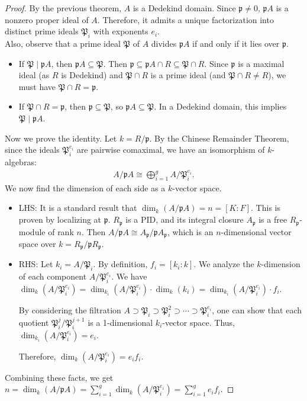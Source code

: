 \documentclass[12pt]{article}
\theoremstyle{plain}
\theoremstyle{remark}
\theoremstyle{definition}
\begin{document}
\begin{proof}
    By the previous theorem, $A$ is a Dedekind domain. Since $\mathfrak{p} \neq 0$, $\mathfrak{p}A$ is a nonzero proper ideal of $A$. Therefore, it admits a unique factorization into distinct prime ideals $\mathfrak{P}_i$ with exponents $e_i$. \\
    Also, observe that a prime ideal $\mathfrak{P}$ of $A$ divides $\mathfrak{p}A$ if and only if it lies over $\mathfrak{p}$.
    \begin{itemize}
        \item[($\implies$)] If $\mathfrak{P} \mid \mathfrak{p}A$, then $\mathfrak{p}A \subseteq \mathfrak{P}$. Then $\mathfrak{p} \subseteq \mathfrak{p}A \cap R \subseteq \mathfrak{P} \cap R$. Since $\mathfrak{p}$ is a maximal ideal (as $R$ is Dedekind) and $\mathfrak{P} \cap R$ is a prime ideal (and $\mathfrak{P} \cap R \neq R$), we must have $\mathfrak{P} \cap R = \mathfrak{p}$.
        \item[($\impliedby$)] If $\mathfrak{P} \cap R = \mathfrak{p}$, then $\mathfrak{p} \subseteq \mathfrak{P}$, so $\mathfrak{p}A \subseteq \mathfrak{P}$. In a Dedekind domain, this implies $\mathfrak{P} \mid \mathfrak{p}A$.
    \end{itemize}
    Now we prove the identity. Let $k = R/\mathfrak{p}$.
    By the Chinese Remainder Theorem, since the ideals $\mathfrak{P}_i^{e_i}$ are pairwise comaximal, we have an isomorphism of $k$-algebras:
    \begin{align*}
        A/\mathfrak{p}A \cong \bigoplus_{i=1}^g A/\mathfrak{P}_i^{e_i}.
    \end{align*}
    We now find the dimension of each side as a $k$-vector space.
    \begin{itemize}
        \item LHS: It is a standard result that $\dim_k(A/\mathfrak{p}A) = n = [K:F]$. This is proven by localizing at $\mathfrak{p}$. $R_\mathfrak{p}$ is a PID, and its integral closure $A_\mathfrak{p}$ is a free $R_\mathfrak{p}$-module of rank $n$. Then $A/\mathfrak{p}A \cong A_\mathfrak{p} / \mathfrak{p}A_\mathfrak{p}$, which is an $n$-dimensional vector space over $k = R_\mathfrak{p} / \mathfrak{p}R_\mathfrak{p}$.
        \item RHS: Let $k_i = A/\mathfrak{P}_i$. By definition, $f_i = [k_i : k]$. We analyze the $k$-dimension of each component $A/\mathfrak{P}_i^{e_i}$. We have $\dim_k(A/\mathfrak{P}_i^{e_i}) = \dim_{k_i}(A/\mathfrak{P}_i^{e_i}) \cdot \dim_k(k_i) = \dim_{k_i}(A/\mathfrak{P}_i^{e_i}) \cdot f_i$.
        
        By considering the filtration $A \supset \mathfrak{P}_i \supset \mathfrak{P}_i^2 \supset \cdots \supset \mathfrak{P}_i^{e_i}$, one can show that each quotient $\mathfrak{P}_i^j / \mathfrak{P}_i^{j+1}$ is a 1-dimensional $k_i$-vector space. Thus, $\dim_{k_i}(A/\mathfrak{P}_i^{e_i}) = e_i$.
        
        Therefore, $\dim_k(A/\mathfrak{P}_i^{e_i}) = e_i f_i$.
    \end{itemize}
    Combining these facts, we get $n = \dim_k(A/\mathfrak{p}A) = \sum_{i=1}^g \dim_k(A/\mathfrak{P}_i^{e_i}) = \sum_{i=1}^g e_i f_i$.
\end{proof}
\end{document}
